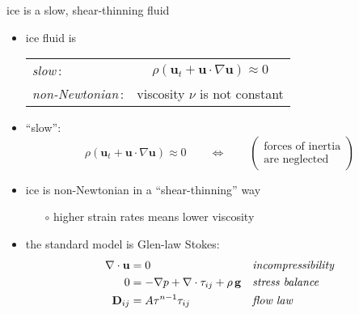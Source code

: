 \begin{frame}{ice is a slow, shear-thinning fluid}

\begin{itemize}
\item ice fluid is

\smallskip
  \begin{tabular}{lc}
  \emph{slow}\,: & $\rho \left(\mathbf{u}_t + \mathbf{u}\cdot\nabla \mathbf{u}\right) \approx 0$ \\
  \emph{non-Newtonian}\,: & viscosity $\nu$ is not constant
  \end{tabular}

\bigskip
\item ``slow'':
  $$\rho \left(\mathbf{u}_t + \mathbf{u}\cdot\nabla \mathbf{u}\right) \approx 0 \qquad \iff \qquad \begin{pmatrix} \text{forces of inertia} \\ \text{are neglected} \end{pmatrix}$$

\medskip
\item ice is non-Newtonian in a ``shear-thinning'' way
  \begin{itemize}
  \item[$\circ$] higher strain rates means lower viscosity
  \end{itemize}

\bigskip
\item the standard model is Glen-law Stokes:
\begin{align*}
\nabla \cdot \mathbf{u} &= 0 &&\text{\emph{incompressibility}} \\
0 &= - \nabla p + \nabla \cdot \tau_{ij} + \rho\, \mathbf{g} &&\text{\emph{stress balance}} \\
\mathbf{D}_{ij} &= A \tau^{n-1} \tau_{ij} &&\text{\emph{flow law}}
\end{align*}

\end{itemize}
\end{frame}


